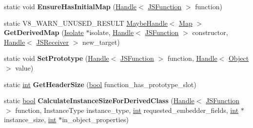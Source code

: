 \begin{DoxyCompactItemize}
\item 
\mbox{\label{classv8_1_1internal_1_1JSFunction_a5ede1c6b434cc020de4d8efdd57498d1}} 
static void {\bfseries Ensure\+Has\+Initial\+Map} (\mbox{\hyperlink{classv8_1_1internal_1_1Handle}{Handle}}$<$ \mbox{\hyperlink{classv8_1_1internal_1_1JSFunction}{J\+S\+Function}} $>$ function)
\item 
\mbox{\label{classv8_1_1internal_1_1JSFunction_a948f847285db8c01e99a0a7ae076cbff}} 
static V8\+\_\+\+W\+A\+R\+N\+\_\+\+U\+N\+U\+S\+E\+D\+\_\+\+R\+E\+S\+U\+LT \mbox{\hyperlink{classv8_1_1internal_1_1MaybeHandle}{Maybe\+Handle}}$<$ \mbox{\hyperlink{classv8_1_1internal_1_1Map}{Map}} $>$ {\bfseries Get\+Derived\+Map} (\mbox{\hyperlink{classv8_1_1internal_1_1Isolate}{Isolate}} $\ast$isolate, \mbox{\hyperlink{classv8_1_1internal_1_1Handle}{Handle}}$<$ \mbox{\hyperlink{classv8_1_1internal_1_1JSFunction}{J\+S\+Function}} $>$ constructor, \mbox{\hyperlink{classv8_1_1internal_1_1Handle}{Handle}}$<$ \mbox{\hyperlink{classv8_1_1internal_1_1JSReceiver}{J\+S\+Receiver}} $>$ new\+\_\+target)
\item 
\mbox{\label{classv8_1_1internal_1_1JSFunction_a8b10c267c842c7c0219ca747585905c0}} 
static void {\bfseries Set\+Prototype} (\mbox{\hyperlink{classv8_1_1internal_1_1Handle}{Handle}}$<$ \mbox{\hyperlink{classv8_1_1internal_1_1JSFunction}{J\+S\+Function}} $>$ function, \mbox{\hyperlink{classv8_1_1internal_1_1Handle}{Handle}}$<$ \mbox{\hyperlink{classv8_1_1internal_1_1Object}{Object}} $>$ value)
\item 
\mbox{\label{classv8_1_1internal_1_1JSFunction_ac15c7640a62d5cd36b60878e29a6e7f8}} 
static \mbox{\hyperlink{classint}{int}} {\bfseries Get\+Header\+Size} (\mbox{\hyperlink{classbool}{bool}} function\+\_\+has\+\_\+prototype\+\_\+slot)
\item 
\mbox{\label{classv8_1_1internal_1_1JSFunction_a1c089e7d87955e5ecaeeb67e6d390bc5}} 
static \mbox{\hyperlink{classbool}{bool}} {\bfseries Calculate\+Instance\+Size\+For\+Derived\+Class} (\mbox{\hyperlink{classv8_1_1internal_1_1Handle}{Handle}}$<$ \mbox{\hyperlink{classv8_1_1internal_1_1JSFunction}{J\+S\+Function}} $>$ function, Instance\+Type instance\+\_\+type, \mbox{\hyperlink{classint}{int}} requested\+\_\+embedder\+\_\+fields, \mbox{\hyperlink{classint}{int}} $\ast$instance\+\_\+size, \mbox{\hyperlink{classint}{int}} $\ast$in\+\_\+object\+\_\+properties)

\end{DoxyCompactItemize}
